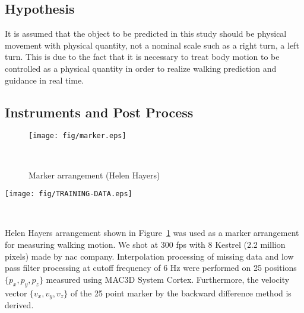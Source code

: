 \documentclass{sigchi}
\begin{document}
\subsection{Hypothesis} %
It is assumed that the object to be predicted in this study should be physical movement with physical quantity, not a nominal scale such as a right turn, a left turn. This is due to the fact that it is necessary to treat body motion to be controlled as a physical quantity in order to realize walking prediction and guidance in real time. 

\subsection{Instruments and Post Process} %

\begin{figure}
\centering
  \texttt{[image: fig/marker.eps]}
  \caption{Marker arrangement (Helen Hayers)}~ \label{fig:marker}
\end{figure}



\begin{figure*}
\centering
  \texttt{[image: fig/TRAINING-DATA.eps]}
  \caption{Parietal marker (appeared in Figure~\ref{fig:marker} black arrow) locus of learning data group}~ 
    \label{fig:training-data}
\end{figure*}


Helen Hayers arrangement shown in Figure~\ref{fig:marker} was used as a marker arrangement for measuring walking motion. We shot at 300 fps with 8 Kestrel (2.2 million pixels) made by nac company. Interpolation processing of missing data and low pass filter processing at cutoff frequency of 6 Hz were performed on 25 positions $\{p_x, p_y, p_z \}$ measured using MAC3D System Cortex. Furthermore, the velocity vector $ \{v_x, v_y, v_z \} $ of the 25 point marker by the backward difference method is derived.
\end{document}
